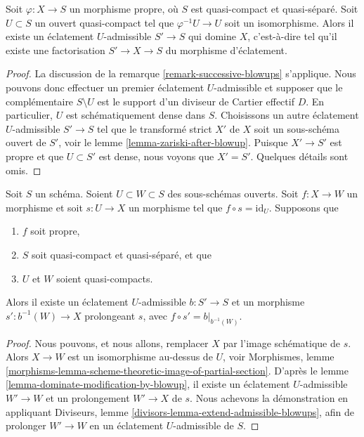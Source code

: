 \begin{lemma}
\label{lemma-dominate-modification-by-blowup}
Soit $\varphi : X \to S$ un morphisme propre, où
$S$ est quasi-compact et quasi-séparé. Soit $U \subset S$ un
ouvert quasi-compact tel que $\varphi^{-1}U \to U$ soit un isomorphisme.
Alors il existe un éclatement $U$-admissible $S' \to S$
qui domine $X$, c'est-à-dire tel qu'il existe une factorisation
$S' \to X \to S$ du morphisme d'éclatement.
\end{lemma}

\begin{proof}
La discussion de la remarque \ref{remark-successive-blowups} s'applique.
Nous pouvons donc effectuer un premier éclatement $U$-admissible et supposer que le complémentaire
$S \setminus U$ est le support d'un diviseur de Cartier effectif $D$.
En particulier, $U$ est schématiquement dense dans $S$.
Choisissons un autre éclatement $U$-admissible $S' \to S$ tel que le transformé
strict $X'$ de $X$ soit un sous-schéma ouvert de $S'$, voir
le lemme \ref{lemma-zariski-after-blowup}.
Puisque $X' \to S'$ est propre et que
$U \subset S'$ est dense, nous voyons que $X' = S'$. Quelques détails sont omis.
\end{proof}

\begin{lemma}
\label{lemma-get-section-after-blowup}
Soit $S$ un schéma. Soient $U \subset W \subset S$ des sous-schémas ouverts.
Soit $f : X \to W$ un morphisme et soit $s : U \to X$ un
morphisme tel que $f \circ s = \text{id}_U$. Supposons que
\begin{enumerate}
\item $f$ soit propre,
\item $S$ soit quasi-compact et quasi-séparé, et que
\item $U$ et $W$ soient quasi-compacts.
\end{enumerate}
Alors il existe un éclatement $U$-admissible $b : S' \to S$ et un morphisme
$s' : b^{-1}(W) \to X$ prolongeant $s$, avec $f \circ s' = b|_{b^{-1}(W)}$.
\end{lemma}

\begin{proof}
Nous pouvons, et nous allons, remplacer $X$ par l'image schématique de $s$.
Alors $X \to W$ est un isomorphisme au-dessus de $U$, voir
Morphismes, lemme
\ref{morphisms-lemma-scheme-theoretic-image-of-partial-section}.
D'après le lemme \ref{lemma-dominate-modification-by-blowup},
il existe un éclatement $U$-admissible $W' \to W$ et un
prolongement $W' \to X$ de $s$.
Nous achevons la démonstration en appliquant
Diviseurs, lemme \ref{divisors-lemma-extend-admissible-blowups},
afin de prolonger $W' \to W$ en un éclatement $U$-admissible de $S$.
\end{proof}









